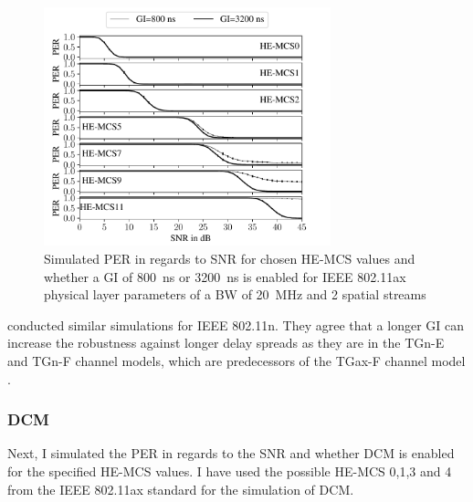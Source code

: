 \begin{figure}[H]%
   \centering
   \includegraphics[width=0.74\textwidth]{figures/GI_PER_to_SNR.pdf}
   \caption{Simulated \ac{PER} in regards to \ac{SNR} for chosen \ac{HE}-\ac{MCS} values and whether a \acf{GI} of \SI{800}{\nano\second} or \SI{3200}{\nano\second} is enabled for IEEE 802.11ax physical layer parameters of a \ac{BW} of \SI{20}{\mega\hertz} and 2 spatial streams}%
   \label{fig:PER_SNR_GI}%
\end{figure}
\textcite{patil_ieee_2020} conducted similar simulations for IEEE 802.11n.
They agree that a longer \ac{GI} can increase the robustness against longer delay spreads as they are in the TGn-E and TGn-F channel models,
which are predecessors of the TGax-F channel model \cite{TGAXCHANNEL}.

\subsubsection*{\acf{DCM}}
Next, I simulated the \ac{PER} in regards to the \ac{SNR}  and whether \ac{DCM} is enabled for the specified \ac{HE}-\ac{MCS} values.
I have used the possible \ac{HE}-\ac{MCS} \num{0},\num{1},\num{3} and \num{4} from the IEEE 802.11ax standard \cite{ieee_standard_2021ax} for the
simulation of \ac{DCM}.

